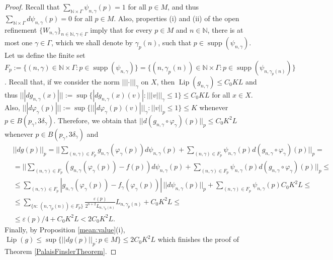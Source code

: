 \documentclass[11pt]{amsart}
\numberwithin{equation}{section}
\begin{document}
\begin{proof}
Recall that $\sum_{\mathbb N\times \Gamma}\psi_{n,\gamma}(p)= 1$  for all $p\in M$, and thus $\sum_{\mathbb N\times \Gamma}d\psi_{n,\gamma}(p)=0$ for all $p\in M$. Also, properties (i) and (ii) of the open refinement $\{W_{n,\gamma}\}_{n\in \mathbb N, \gamma \in \Gamma}$ imply that for every $p\in M$  and $n\in\mathbb{N}$,
there is at most one $\gamma\in\Gamma$, which we shall denote by $\gamma_p(n)$,  such that $p\in {\operatorname{supp}}  (\psi_{n,\gamma})$. Let us  define the finite set $F_p:=\{(n, \gamma)\in \mathbb N \times \Gamma:
 p\in {\operatorname{supp}}(\psi_{n,\gamma})\}=\{(n, \gamma_p(n))\in \mathbb N \times \Gamma:
 p\in {\operatorname{supp}}(\psi_{n,\gamma_p(n)})\}$.
Recall that, if we consider the norm $|||\cdot |||_\gamma$ on $X$, then ${\operatorname{Lip}}(g_{n,\gamma})\le  C_0 K L $ and thus
$|||dg_{n,\gamma}(x)|||:=\sup\{ |dg_{n,\gamma}(x)(v)| : |||v|||_\gamma\le 1\} \le  C_0 K L$ for all $x\in X$.
Also, $|||d\varphi_{\gamma}(p)|||:=\sup\{|||d\varphi_{\gamma}(p)(v)|||_\gamma: ||v||_p\le 1\}\le K$ whenever $p\in B(p_\gamma, 3\delta_{\gamma})$.
Therefore, we obtain that $||d(g_{n,\gamma}\circ\varphi_{\gamma})(p)||_p
\le C_0K^2L$ whenever $p \in  B(p_\gamma, 3\delta_{\gamma})$ and
\begin{align*}
&||dg(p)||_p = ||\sum_{(n,\gamma)\in F_p} g_{n,\gamma}(\varphi_{\gamma}(p)) d\psi_{n,\gamma}(p)+
\sum_{(n,\gamma)\in F_p}\psi_{n,\gamma}(p) d(g_{n,\gamma}\circ\varphi_{\gamma})(p)||_p=\\
&=||\sum_{ (n,\gamma)\in F_p} (g_{n,\gamma}(\varphi_{\gamma}(p))-f(p)) d\psi_{n,\gamma}(p)+
\sum_{(n,\gamma)\in F_p}\psi_{n,\gamma}(p) d(g_{n,\gamma}\circ\varphi_{\gamma})(p)||_p\le \\
& \le  \sum_{(n,\gamma) \in F_p} |g_{n,\gamma}(\varphi_{\gamma}(p))-{f}_\gamma(\varphi_{\gamma}(p))| \,||d \psi_{n,\gamma}(p)||_p  + \sum_{(n,\gamma)\in F_p}\psi_{n,\gamma}(p)C_0 K^2L   \le \\
 &  \le \sum_{\{n:\,(n,\gamma_p(n))\in F_p\}} \frac{\varepsilon(p)}{2^{n+2} L_{n,\gamma_p(n)}}  L_{n,\gamma_p(n)}+C_0
K^2L \le \\
 & \le \varepsilon(p)/4+C_0K^2L<2C_0K^2L.
\end{align*}
Finally, by Proposition \ref{mean:value}(i), ${\operatorname{Lip}}(g) \le \sup\{||dg(p)||_p : p\in M\}\le 2C_0 K^2 L$ which finishes the proof of Theorem \ref{PalaisFinslerTheorem}.

\medskip


\end{proof}
\end{document}
